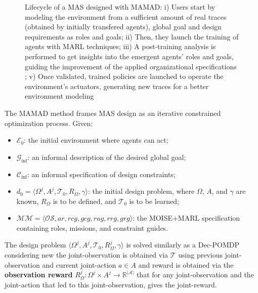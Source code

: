 \documentclass[pdflatex,sn-mathphys-num]{sn-jnl}%
\theoremstyle{thmstyleone}%
\theoremstyle{thmstyletwo}%
\theoremstyle{thmstylethree}%
\begin{document}
\begin{figure}[h!]
    \centering
    
    \caption{Lifecycle of a MAS designed with MAMAD: i) Users start by modeling the environment from a sufficient amount of real traces (obtained by initially transfered agents), global goal and design requirements as roles and goals; \quad ii) Then, they launch the training of agents with MARL techniques; \quad iii) A post-training analysis is performed to get insights into the emergent agents' roles and goals, guiding the improvement of the applied organizational specifications ; \quad v) Once validated, trained policies are launched to operate the environment's actuators, generating new traces for a better environment modeling}
    \label{fig:cycle}
\end{figure}

The MAMAD method frames MAS design as an iterative constrained optimization process. Given:
\begin{itemize}
    \item $\mathcal{E}_0$: the initial environment where agents can act;
    \item $\mathcal{G}_{\text{inf}}$: an informal description of the desired global goal;
    \item $\mathcal{C}_{\text{inf}}$: an informal specification of design constraints;
    \item $d_0 = \langle \Omega^j, A^j, \mathcal{T}_0, R_{\Omega}, \gamma \rangle$: the initial design problem, where $\Omega$, $A$, and $\gamma$ are known, $R_{\Omega}$ is to be defined, and $\mathcal{T}_0$ is to be learned;
    \item $\mathcal{MM} = \langle \mathcal{OS}, ar, rcg, gcg, rag, rrg, grg \rangle$: the MOISE+MARL specification containing roles, missions, and constraint guides.
\end{itemize}

The design problem $\langle \Omega^j, A^j, \mathcal{T}_0, R_{\Omega}^j, \gamma \rangle$ is solved similarly as a Dec-POMDP considering new the joint-observation is obtained via $\mathcal{T}$ using previous joint-observation and current joint-action $a \in A$ and reward is obtained via the \textbf{observation reward} $R^j_{\Omega}: \Omega^j \times A^j \rightarrow \mathbb{R}^{|\mathcal{A}|}$ that for any joint-observation and the joint-action that led to this joint-observation, gives the joint-reward.

\vspace{1em}
\end{document}

